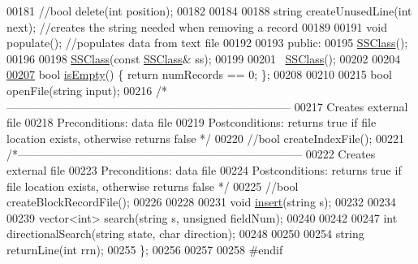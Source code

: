 \begin{DoxyCode}
00181     \textcolor{comment}{//bool delete(int position);}
00182 
00184 
00188     \textcolor{keywordtype}{string} createUnusedLine(\textcolor{keywordtype}{int} next); \textcolor{comment}{//creates the string needed when removing a record}
00189 
00191     \textcolor{keywordtype}{void} populate(); \textcolor{comment}{//populates data from text file}
00192 
00193 \textcolor{keyword}{public}:
00195     \hyperlink{classSSClass}{SSClass}();
00196 
00198     \hyperlink{classSSClass}{SSClass}(\textcolor{keyword}{const} \hyperlink{classSSClass}{SSClass}& ss);
00199     
00201     ~\hyperlink{classSSClass}{SSClass}();
00202 
00204 
\hyperlink{classSSClass_afc95611385e4d389818332414d5c491c}{00207}     \textcolor{keywordtype}{bool} \hyperlink{classSSClass_afc95611385e4d389818332414d5c491c}{isEmpty}() \{ \textcolor{keywordflow}{return} numRecords == 0; \};
00208 
00210 
00215     \textcolor{keywordtype}{bool} openFile(\textcolor{keywordtype}{string} input);
00216     \textcolor{comment}{/*---------------------------------------------------------------------------}
00217 \textcolor{comment}{       Creates external file}
00218 \textcolor{comment}{       Preconditions:   data file}
00219 \textcolor{comment}{       Postconditions:  returns true if file location exists, otherwise returns false */}
00220     \textcolor{comment}{//bool createIndexFile();}
00221     \textcolor{comment}{/*---------------------------------------------------------------------------}
00222 \textcolor{comment}{       Creates external file}
00223 \textcolor{comment}{       Preconditions:   data file}
00224 \textcolor{comment}{       Postconditions:  returns true if file location exists, otherwise returns false */}
00225     \textcolor{comment}{//bool createBlockRecordFile();}
00226        
00228 
00231     \textcolor{keywordtype}{void} \hyperlink{BTree_8h_ac86ce26a0b0ec9d79b918b285fe9da38}{insert}(\textcolor{keywordtype}{string} s);
00232     
00234 
00239     vector<int> search(\textcolor{keywordtype}{string} s, \textcolor{keywordtype}{unsigned} fieldNum);
00240 
00242 
00247     \textcolor{keywordtype}{int} directionalSearch(\textcolor{keywordtype}{string} state, \textcolor{keywordtype}{char} direction);
00248     
00250 
00254     \textcolor{keywordtype}{string} returnLine(\textcolor{keywordtype}{int} rrn);
00255 \};
00256 
00257 
00258 \textcolor{preprocessor}{#endif}
\end{DoxyCode}
